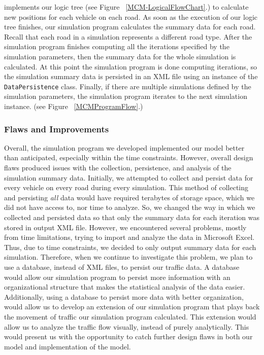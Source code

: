 \documentclass{amsart}
\begin{document}
implements our logic tree (see Figure ~\ref{MCM-LogicalFlowChart}.) to calculate new positions for each vehicle on each road. As soon as the execution of our logic tree finishes, our simulation program calculates the summary data for each road. Recall that each road in a simulation represents a different road type. After the simulation program finishes computing all the iterations specified by the simulation parameters, then the summary data for the whole simulation is calculated. At this point the simulation program is done computing iterations, so the simulation summary data is persisted in an XML file using an instance of the \texttt{DataPersistence} class. Finally, if there are multiple simulations defined by the simulation parameters, the simulation program iterates to the next simulation instance. (see Figure ~\ref{MCMProgramFlow}.)
			
		\subsubsection{Flaws and Improvements}
			Overall, the simulation program we developed implemented our model better than anticipated, especially within the time constraints. However, overall design flaws produced issues with the collection, persistence, and analysis of the simulation summary data. Initially, we attempted to collect and persist data for every vehicle on every road during every simulation. This method of collecting and persisting \emph{all} data would have required terabytes of storage space, which we did not have access to, nor time to analyze. So, we changed the way in which we collected and persisted data so that only the summary data for each iteration was stored in output XML file. However, we encountered several problems, mostly from time limitations, trying to import and analyze the data in Microsoft Excel. Thus, due to time constraints, we decided to only output summary data for each simulation. Therefore, when we continue to investigate this problem, we plan to use a database, instead of XML files, to persist our traffic data. A database would allow our simulation program to persist more information with an organizational structure that makes the statistical analysis of the data easier. Additionally, using a database to persist more data with better organization, would allow us to develop an extension of our simulation program that plays back the movement of traffic our simulation program calculated. This extension would allow us to analyze the traffic flow visually, instead of purely analytically. This would present us with the opportunity to catch further design flaws in both our model and implementation of the model.	
			
\end{document}
